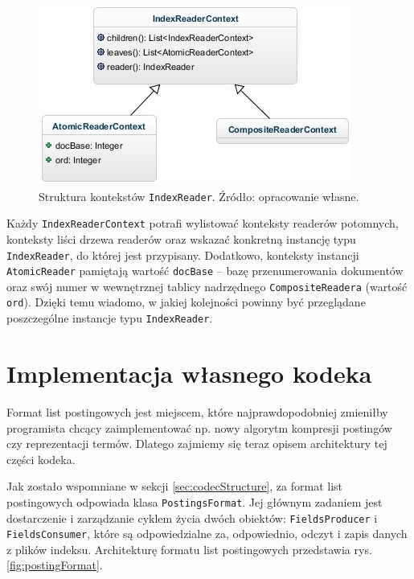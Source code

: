 \begin{figure}[here]
 \centering
 \includegraphics[scale=0.7]{pictures/ReaderContexts.jpg}
 \caption{Struktura kontekstów \texttt{IndexReader}. Źródło: opracowanie własne. \label{fig:indexReaderContexts}}
\end{figure}

Każdy \texttt{IndexReaderContext} potrafi wylistować konteksty readerów potomnych, konteksty liści drzewa readerów oraz wskazać konkretną instancję typu \texttt{IndexReader}, do której jest przypisany. Dodatkowo, konteksty instancji \texttt{AtomicReader} pamiętają wartość \texttt{docBase} -- bazę przenumerowania dokumentów oraz swój numer w wewnętrznej tablicy nadrzędnego \texttt{CompositeReadera} (wartość \texttt{ord}). Dzięki temu wiadomo, w jakiej kolejności powinny być przeglądane poszczególne instancje typu \texttt{IndexReader}.

\section{Implementacja własnego kodeka}

Format list postingowych jest miejscem, które najprawdopodobniej zmieniłby programista chcący zaimplementować np. nowy algorytm kompresji postingów czy reprezentacji termów. Dlatego zajmiemy się teraz opisem architektury tej części kodeka. 

Jak zostało wspomniane w sekcji \ref{sec:codecStructure}, za format list postingowych odpowiada klasa \texttt{PostingsFormat}. Jej głównym zadaniem jest dostarczenie i zarządzanie cyklem życia dwóch obiektów: \texttt{FieldsProducer} i \texttt{FieldsConsumer}, które są odpowiedzialne za, odpowiednio, odczyt i zapis danych z plików indeksu. Architekturę formatu list postingowych przedstawia rys. \ref{fig:postingFormat}.

